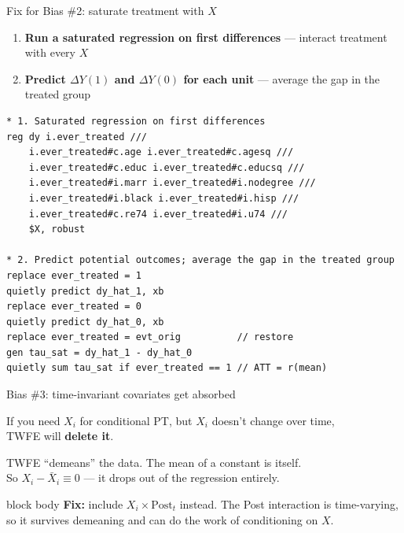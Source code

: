 \documentclass[aspectratio=169,11pt]{beamer}
\newcommand{\emphbox}[1]{%
  \begin{beamercolorbox}[rounded=true,sep=7pt,wd=\linewidth]{block body}%
    \small\color{slate} #1%
  \end{beamercolorbox}}
\begin{document}
\begin{frame}[fragile]{Fix for Bias \#2: saturate treatment with $X$}
\vspace{0.2em}
\begin{enumerate}\setlength\itemsep{0.4em}\small
  \item \textbf{Run a saturated regression on first differences} --- interact treatment with every $X$
  \item \textbf{Predict $\Delta Y(1)$ and $\Delta Y(0)$ for each unit} --- average the gap in the treated group
\end{enumerate}
\vspace{0.3em}
\begin{lstlisting}[language={[ANSI]C},basicstyle=\ttfamily\tiny]
* 1. Saturated regression on first differences
reg dy i.ever_treated ///
    i.ever_treated#c.age i.ever_treated#c.agesq ///
    i.ever_treated#c.educ i.ever_treated#c.educsq ///
    i.ever_treated#i.marr i.ever_treated#i.nodegree ///
    i.ever_treated#i.black i.ever_treated#i.hisp ///
    i.ever_treated#c.re74 i.ever_treated#i.u74 ///
    $X, robust

* 2. Predict potential outcomes; average the gap in the treated group
replace ever_treated = 1
quietly predict dy_hat_1, xb
replace ever_treated = 0
quietly predict dy_hat_0, xb
replace ever_treated = evt_orig          // restore
gen tau_sat = dy_hat_1 - dy_hat_0
quietly sum tau_sat if ever_treated == 1 // ATT = r(mean)
\end{lstlisting}
\end{frame}


\begin{frame}{Bias \#3: time-invariant covariates get absorbed}
\vspace{0.6em}
\begin{center}
If you need $X_i$ for conditional PT, but $X_i$ doesn't change over time,\\
TWFE will \textbf{delete it}.
\end{center}
\vspace{0.5em}
\begin{center}\color{warmgray}\small
TWFE ``demeans'' the data. The mean of a constant is itself.\\
So $X_i - \bar{X}_i \equiv 0$ --- it drops out of the regression entirely.
\end{center}
\vspace{0.5em}
\emphbox{\textbf{Fix:} include $X_i \times \mathrm{Post}_t$ instead. \;The Post interaction is time-varying,\\
so it survives demeaning and can do the work of conditioning on $X$.}
\end{frame}
\end{document}

